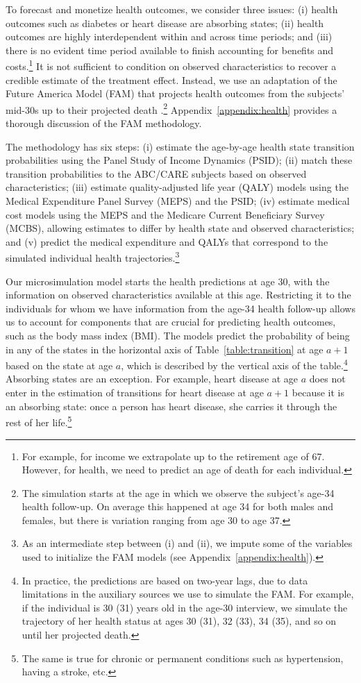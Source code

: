 To forecast and monetize health outcomes, we consider three issues: (i) health outcomes such as diabetes or heart disease are absorbing states; (ii) health outcomes are highly interdependent within and across time periods; and (iii) there is no evident time period available to finish accounting for benefits and costs.\footnote{For example, for income we extrapolate up to the retirement age of 67. However, for health, we need to predict an age of death for each individual.} It is not sufficient to condition on observed characteristics to recover a credible estimate of the treatment effect. Instead, we use an adaptation of the Future America Model (FAM) that projects health outcomes from the subjects' mid-30s up to their projected death \citep{Goldman_etal_2015_Future-Elderly-Model-Report}.\footnote{The simulation starts at the age in which we observe the subject's age-34 health follow-up. On average this happened at age 34 for both males and females, but there is variation ranging from age 30 to age 37.} Appendix~\ref{appendix:health} provides a thorough discussion of the FAM methodology.

 The methodology has six steps: (i) estimate the age-by-age health state transition probabilities using the Panel Study of Income Dynamics (PSID); (ii) match these transition probabilities to the ABC/CARE subjects based on observed characteristics; (iii) estimate quality-adjusted life year (QALY) models using the Medical Expenditure Panel Survey (MEPS) and the PSID; (iv) estimate medical cost models using the MEPS and the Medicare Current Beneficiary Survey (MCBS), allowing estimates to differ by health state and observed characteristics; and (v) predict the medical expenditure and QALYs that correspond to the simulated individual health trajectories.\footnote{As an intermediate step between (i) and (ii), we impute some of the variables used to initialize the FAM models (see Appendix~\ref{appendix:health}).}

Our microsimulation model starts the health predictions at age 30, with the information on observed characteristics available at this age. Restricting it to the individuals for whom we have information from the age-34 health follow-up allows us to account for components that are crucial for predicting health outcomes, such as the body mass index (BMI). The models predict the probability of being in any of the states in the horizontal axis of Table~\ref{table:transition} at age $a+1$ based on the state at age $a$, which is described by the vertical axis of the table.\footnote{In practice, the predictions are based on two-year lags, due to data limitations in the auxiliary sources we use to simulate the FAM. For example, if the individual is 30 (31) years old in the age-30 interview, we simulate the trajectory of her health status at ages 30 (31), 32 (33), 34 (35), and so on until her projected death.} Absorbing states are an exception. For example, heart disease at age $a$ does not enter in the estimation of transitions for heart disease at age $a+1$ because it is an absorbing state: once a person has heart disease, she carries it through the rest of her life.\footnote{The same is true for chronic or permanent conditions such as hypertension, having a stroke, etc.}

